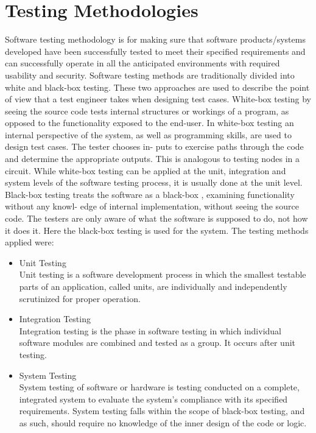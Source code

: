 \documentclass[11pt]{report}
\begin{document}
\section{Testing Methodologies}
Software testing methodology is for making sure that software products/systems developed have
been successfully tested to meet their specified requirements and can successfully operate in all the
anticipated environments with required usability and security.
Software testing methods are traditionally divided into white and black-box testing. These two
approaches are used to describe the point of view that a test engineer takes when designing test
cases.
White-box testing by seeing the source code tests internal structures or workings of a program, as
opposed to the functionality exposed to the end-user. In white-box testing an internal perspective
of the system, as well as programming skills, are used to design test cases. The tester chooses in-
puts to exercise paths through the code and determine the appropriate outputs. This is analogous
to testing nodes in a circuit. While white-box testing can be applied at the unit, integration and system levels of the software testing process, it is usually done at the unit level.
Black-box testing treats the software as a black-box , examining functionality without any knowl-
edge of internal implementation, without seeing the source code. The testers are only aware of
what the software is supposed to do, not how it does it. Here the black-box testing is used for the
system. The testing methods applied were:

\begin{itemize}
    \item Unit Testing \\
Unit testing is a software development process in which the smallest testable parts of an
application, called units, are individually and independently scrutinized for proper operation.
    \item Integration Testing \\
    Integration testing is the phase in software testing in which individual software modules are
    combined and tested as a group. It occurs after unit testing.
    \item System Testing \\
    System testing of software or hardware is testing conducted on a complete, integrated system
    to evaluate the system’s compliance with its specified requirements. System testing falls
    within the scope of black-box testing, and as such, should require no knowledge of the inner
    design of the code or logic.
\end{itemize}
\end{document}
